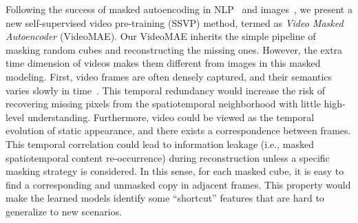 \documentclass{article}
\begin{document}
Following the success of masked autoencoding in NLP~\cite{devlin2019bert} and images~\cite{he2021masked,beit}, we present a new self-supervised video pre-training (SSVP) method, termed as {\em Video Masked Autoencoder} (VideoMAE). Our VideoMAE inherits the simple pipeline of masking random cubes and reconstructing the missing ones. However, the extra time dimension of videos makes them different from images in this masked modeling. First, video frames are often densely captured, and their semantics varies slowly in time~\cite{slowness12}. This temporal redundancy would increase the risk of recovering missing pixels from the spatiotemporal neighborhood with little high-level understanding. Furthermore, video could be viewed as the temporal evolution of static appearance, and there exists a correspondence between frames. This temporal correlation could lead to information leakage (i.e., masked spatiotemporal content re-occurrence) during reconstruction unless a specific masking strategy is considered. In this sense, for each masked cube, it is easy to find a corresponding and unmasked copy in adjacent frames. This property would make the learned models identify some “shortcut” features that are hard to generalize to new scenarios. 
\end{document}
